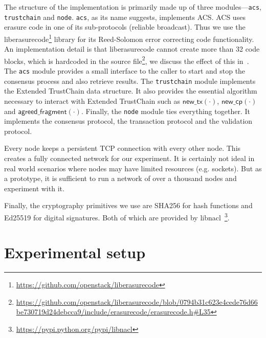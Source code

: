 The structure of the implementation is primarily made up of three modules---\texttt{acs}, \texttt{trustchain} and \texttt{node}.
\texttt{acs}, as its name suggests, implements ACS.
ACS uses erasure code in one of its sub-protocols (reliable broadcast).
Thus we use the liberasurecode\footnote{\url{https://github.com/openstack/liberasurecode}} library for its Reed-Solomon error correcting code functionality.
An implementation detail is that liberasurecode cannot create more than 32 code blocks, which is hardcoded in the source file\footnote{\url{https://github.com/openstack/liberasurecode/blob/0794b31c623e4cede76d66be730719d24debcca9/include/erasurecode/erasurecode.h\#L35}
}, we discuss the effect of this in~.
The \texttt{acs} module provides a small interface to the caller to start and stop the consensus process and also retrieve results.
The \texttt{trustchain} module implements the Extended TrustChain data structure.
It also provides the essential algorithm necessary to interact with Extended TrustChain such as 
$\textsf{new\_tx}(\cdot)$, $\textsf{new\_cp}(\cdot)$ and $\textsf{agreed\_fragment}(\cdot)$.
Finally, the \texttt{node} module ties everything together.
It implements the consensus protocol, the transaction protocol and the validation protocol.


Every node keeps a persistent TCP connection with every other node.
This creates a fully connected network for our experiment.
It is certainly not ideal in real world scenarios where nodes may have limited resources (e.g. sockets).
But as a prototype, it is sufficient to run a network of over a thousand nodes and experiment with it.

Finally, the cryptography primitives we use are SHA256 for hash functions and Ed25519 for digital signatures.
Both of which are provided by libnacl~\footnote{\url{https://pypi.python.org/pypi/libnacl}}.


\section{Experimental setup}
\label{sec:experimental-setup}

